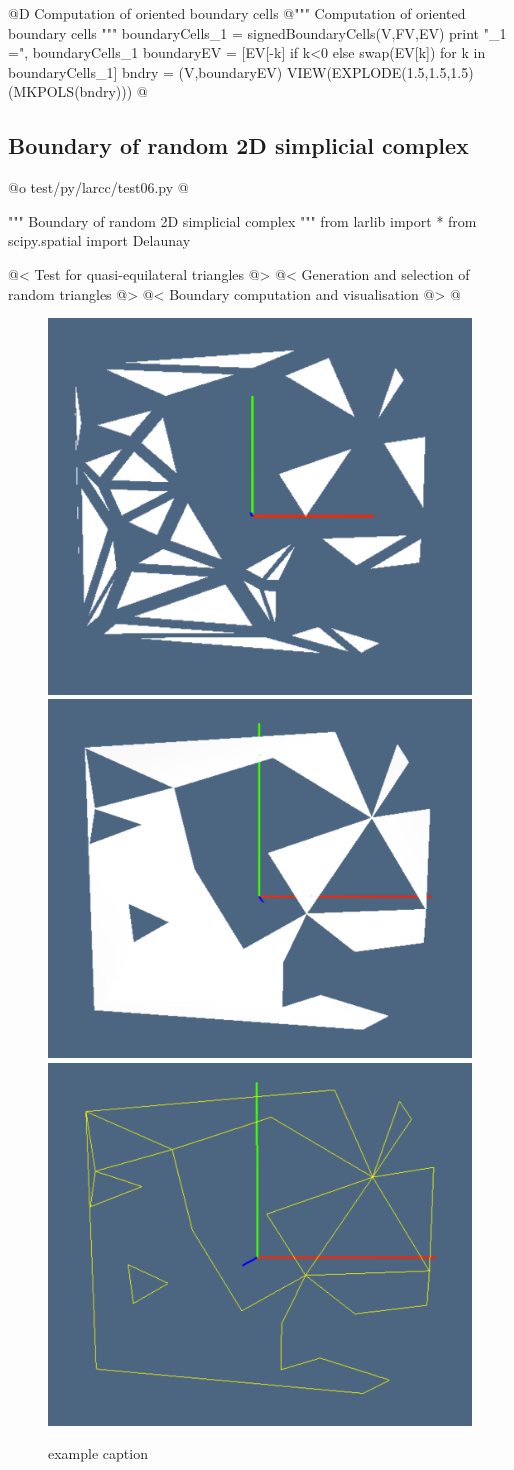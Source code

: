 \documentclass[11pt,oneside]{article}	%
\begin{document}
@D Computation of oriented boundary cells 
@{"""  Computation of oriented boundary cells """
boundaryCells_1 = signedBoundaryCells(V,FV,EV)
print "\nboundaryCells_1 =\n", boundaryCells_1
boundaryEV = [EV[-k] if k<0 else swap(EV[k]) for k in boundaryCells_1]
bndry = (V,boundaryEV)
VIEW(EXPLODE(1.5,1.5,1.5)(MKPOLS(bndry)))
@}

\subsection{Boundary of random 2D simplicial complex}

@o test/py/larcc/test06.py
@{""" Boundary of random 2D simplicial complex """
from larlib import *
from scipy.spatial import Delaunay

@< Test for quasi-equilateral triangles @>
@< Generation and selection of random triangles @>
@< Boundary computation and visualisation @>
@}


\begin{figure}[htbp] %
   \centering
   \includegraphics[height=0.25\linewidth,width=0.32\linewidth]{images/tria0} 
   \includegraphics[height=0.25\linewidth,width=0.32\linewidth]{images/tria1} 
   \includegraphics[height=0.25\linewidth,width=0.32\linewidth]{images/tria2} 
   \caption{example caption}
   \label{fig:example}
\end{figure}
\end{document}
